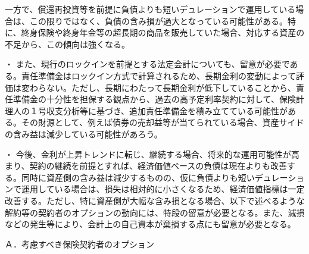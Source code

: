 \documentclass[report,gutter=10mm,fore-edge=10mm,uplatex,dvipdfmx]{jlreq}
\begin{document}
一方で、償還再投資等を前提に負債よりも短いデュレーションで運用している場合は、この限りではなく、負債の含み損が過大となっている可能性がある。特に、終身保険や終身年金等の超長期の商品を販売していた場合、対応する資産の不足から、この傾向は強くなる。

・ また、現行のロックインを前提とする法定会計についても、留意が必要である。責任準備金はロックイン方式で計算されるため、長期金利の変動によって評価は変わらない。ただし、長期にわたって長期金利が低下していることから、責任準備金の十分性を担保する観点から、過去の高予定利率契約に対して、保険計理人の１号収支分析等に基づき、追加責任準備金を積み立てている可能性がある。その財源として、例えば債券の売却益等が当てられている場合、資産サイドの含み益は減少している可能性があろう。

・ 今後、金利が上昇トレンドに転じ、継続する場合、将来的な運用可能性が高まり、契約の継続を前提とすれば、経済価値ベースの負債は現在よりも改善する。同時に資産側の含み益は減少するものの、仮に負債よりも短いデュレーションで運用している場合は、損失は相対的に小さくなるため、経済価値指標は一定改善する。ただし、特に資産側が大幅な含み損となる場合、以下で述べるような解約等の契約者のオプションの動向には、特段の留意が必要となる。また、減損などの発生等により、会計上の自己資本が棄損する点にも留意が必要となる。

Ａ．考慮すべき保険契約者のオプション
\end{document}
